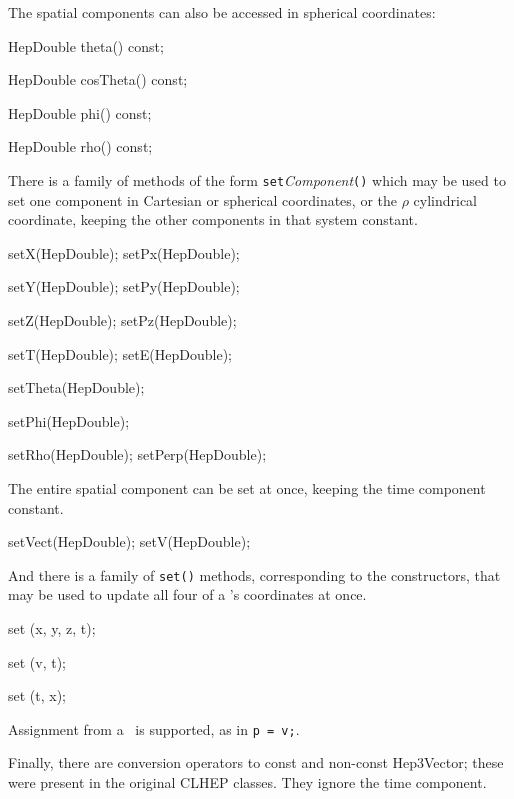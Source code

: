 The spatial components can also be accessed in spherical coordinates:
\begin{shortlist}
  \item HepDouble theta() const;
  \item HepDouble cosTheta() const;
  \item HepDouble phi() const;
  \item HepDouble rho() const;
\end{shortlist}

\noindent
There is a family of methods of the form
{\tt set}{\it Component}{\tt ()} which may be used to set 
one component in Cartesian or spherical coordinates, or the $\rho$
cylindrical coordinate,
keeping the other components in that system constant.  
\begin{shortlist}
  \item setX(HepDouble);  \/\/\/ setPx(HepDouble);  
  \item setY(HepDouble);  \/\/\/ setPy(HepDouble);  
  \item setZ(HepDouble);  \/\/\/ setPz(HepDouble);  
  \item setT(HepDouble);  \/\/\/ setE(HepDouble);  
  \item setTheta(HepDouble); \see{\ref{eq:polar}}
  \item setPhi(HepDouble);   \see{\ref{eq:polar}}
  \item setRho(HepDouble); \/\/\/  setPerp(HepDouble); 
						\see{\ref{eq:cylindrical}}
\end{shortlist}

The entire spatial component can be set at once, keeping the time component 
constant.

\begin{shortlist}
  \item setVect(HepDouble);  \/\/\/ setV(HepDouble);  
\end{shortlist}

\noindent
And there is a family of {\tt set()} methods, corresponding to the 
constructors,
that may be used to update all four of a \LV 's coordinates at once.
\begin{shortlist}
  \item set (x, y, z, t);
  \item set (v, t);
  \item set (t, x);
\end{shortlist}

\noindent
Assignment from a \SV\ is supported, as in \verb|p = v;|.

\noindent
Finally, there are conversion operators to const and non-const Hep3Vector;
these were present in the original CLHEP classes.  
They ignore the time component.

